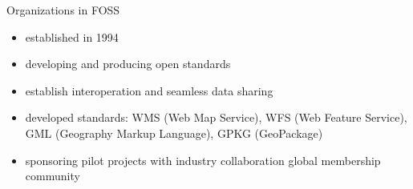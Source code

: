 \documentclass{beamer}
\begin{document}
\begin{frame}[allowframebreaks]{Organizations in FOSS}
\begin{itemize}
                \begin{itemize}
                    \item established in 1994
                    \item developing and producing open standards
                    \item establish interoperation and seamless data sharing
                    \item developed standards: WMS (Web Map Service), WFS (Web Feature Service), GML (Geography Markup Language), GPKG (GeoPackage)  
                    \item sponsoring pilot projects with industry collaboration global membership community
                \end{itemize}
                
            \end{itemize}
        \end{frame}
        
\end{document}
